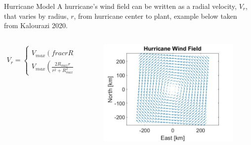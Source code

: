 \documentclass[aspectratio=169]{beamer}
\begin{document}
\begin{frame}{Hurricane Model}
A hurricane's wind field can be written as a radial velocity, $V_r$, that varies by radius, $r$, from hurricane center to plant, example below taken from Kalourazi 2020.
    \begin{columns}
    \begin{column}{0.55\textwidth}
        \begin{align}
        V_r = 
        \begin{cases}
                V_{max} \left( frac{r}{R_{max}}\right)^{\frac{3}{2}}, & r <
                R_{max} \\
                V_{max} \left( \frac{2 R_{max} r}{r^2 + R_{max}^2} \right), & r \geq R_{max} 
        \end{cases}
        \end{align}
        \end{column}
        \begin{column}{0.45\textwidth}
            \begin{figure}
            \centering
            \includegraphics[width=1\textwidth]{HurricaneWindField.jpg}
        \end{figure}
        \end{column}
    \end{columns}

    
\end{frame}
\end{document}
